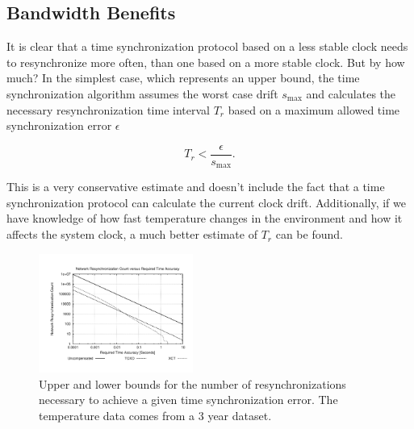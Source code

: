 \subsection{Bandwidth Benefits}

It is clear that a time synchronization protocol based on a less
stable clock needs to resynchronize more often, than one based on
a more stable clock. But by how much? In the simplest case,
which represents an upper bound, the time synchronization algorithm assumes
the worst case drift $s_{\max}$ and calculates the necessary resynchronization
time interval $T_r$ based on a maximum allowed time synchronization error
$\epsilon$

\begin{equation}
    T_r < \frac{\epsilon}{s_{\max}}.
\end{equation}

This is a very conservative estimate and doesn't include the fact that a time
synchronization protocol can calculate the current clock drift. Additionally,
if we have knowledge of how fast temperature changes in the environment and
how it affects the system clock, a much better estimate of $T_r$ can be found. 

\begin{figure}
    \begin{center}
        \includegraphics[angle=-90,width=0.45\textwidth]{figures/mosscamresync}
        \caption{Upper and lower bounds for the number of resynchronizations
        necessary to achieve a given time synchronization error. The
        temperature data comes from a 3 year dataset.}
        \label{fig:resync}
    \end{center}
\end{figure}

